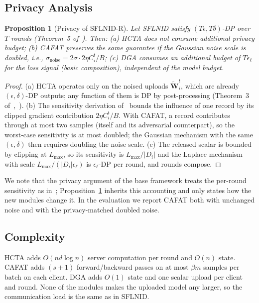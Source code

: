 \documentclass[journal]{IEEEtran}
\newtheorem{proposition}{Proposition}
\begin{document}
\subsection{Privacy Analysis}\label{sec:priv}
\begin{proposition}[Privacy of SFLNID-R]\label{prop:priv}
Let SFLNID satisfy $(T\epsilon,T\delta)$-DP over $T$ rounds (Theorem~5 of~\cite{sflnid}). Then:
(a) HCTA does not consume additional privacy budget;
(b) CAFAT preserves the same guarantee if the Gaussian noise scale is doubled, i.e., $\sigma_{\mathrm{noise}}=2\sigma\cdot2\eta C_i^t/B$;
(c) DGA consumes an additional budget of $T\epsilon_\ell$ for the loss signal (basic composition), independent of the model budget.
\end{proposition}
\begin{proof}
(a) HCTA operates only on the noised uploads $\tilde{\mathbf{W}}_i^t$, which are already $(\epsilon,\delta)$-DP outputs; any function of them is DP by post-processing (Theorem~3 of~\cite{sflnid},~\cite{dwork}). (b) The sensitivity derivation of~\cite{sflnid} bounds the influence of one record by its clipped gradient contribution $2\eta C_i^t/B$. With CAFAT, a record contributes through at most two samples (itself and its adversarial counterpart), so the worst-case sensitivity is at most doubled; the Gaussian mechanism with the same $(\epsilon,\delta)$ then requires doubling the noise scale. (c) The released scalar is bounded by clipping at $L_{\max}$, so its sensitivity is $L_{\max}/|D_i|$ and the Laplace mechanism with scale $L_{\max}/(|D_i|\epsilon_\ell)$ is $\epsilon_\ell$-DP per round, and rounds compose.
\end{proof}
We note that the privacy argument of the base framework treats the per-round sensitivity as in~\cite{sflnid}; Proposition~\ref{prop:priv} inherits this accounting and only states how the new modules change it. In the evaluation we report CAFAT both with unchanged noise and with the privacy-matched doubled noise.

\subsection{Complexity}
HCTA adds $O(nd\log n)$ server computation per round and $O(n)$ state. CAFAT adds $(s+1)$ forward/backward passes on at most $\beta m$ samples per batch on each client. DGA adds $O(1)$ state and one scalar upload per client and round. None of the modules makes the uploaded model any larger, so the communication load is the same as in SFLNID.
\end{document}
